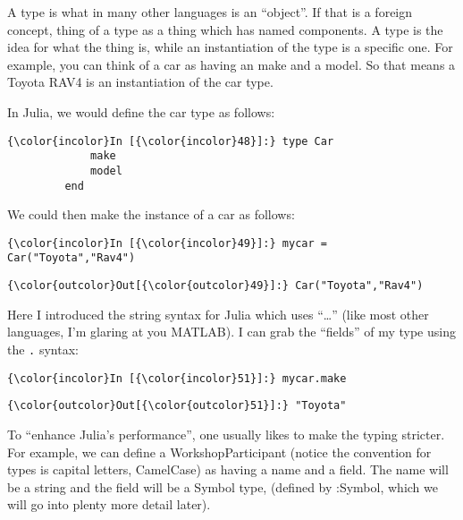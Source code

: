 \documentclass[11pt]{article}
\begin{document}
A type is what in many other languages is an ``object''. If that is a
foreign concept, thing of a type as a thing which has named components.
A type is the idea for what the thing is, while an instantiation of the
type is a specific one. For example, you can think of a car as having an
make and a model. So that means a Toyota RAV4 is an instantiation of the
car type.

In Julia, we would define the car type as follows:

    \begin{Verbatim}[commandchars=\\\{\}]
{\color{incolor}In [{\color{incolor}48}]:} type Car
             make
             model
         end
\end{Verbatim}

    We could then make the instance of a car as follows:

    \begin{Verbatim}[commandchars=\\\{\}]
{\color{incolor}In [{\color{incolor}49}]:} mycar = Car("Toyota","Rav4")
\end{Verbatim}

            \begin{Verbatim}[commandchars=\\\{\}]
{\color{outcolor}Out[{\color{outcolor}49}]:} Car("Toyota","Rav4")
\end{Verbatim}
        
    Here I introduced the string syntax for Julia which uses ``\ldots{}''
(like most other languages, I'm glaring at you MATLAB). I can grab the
``fields'' of my type using the \texttt{.} syntax:

    \begin{Verbatim}[commandchars=\\\{\}]
{\color{incolor}In [{\color{incolor}51}]:} mycar.make
\end{Verbatim}

            \begin{Verbatim}[commandchars=\\\{\}]
{\color{outcolor}Out[{\color{outcolor}51}]:} "Toyota"
\end{Verbatim}
        
    To ``enhance Julia's performance'', one usually likes to make the typing
stricter. For example, we can define a WorkshopParticipant (notice the
convention for types is capital letters, CamelCase) as having a name and
a field. The name will be a string and the field will be a Symbol type,
(defined by :Symbol, which we will go into plenty more detail later).
\end{document}
